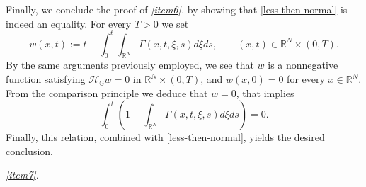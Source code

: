 \documentclass[11pt,a4paper]{article}
\numberwithin{equation}{section}
\def \rn {{\mathbb {R}}^{N}}
\def \GG {{\mathbb{G}}}
\def \H {\mathscr{H}_\GG}
\def \G {{\Gamma}}
\def \x {{\xi}}
\begin{document}
\begin{pf-fundamental}
	
	Finally, we conclude the proof of \emph{\ref{item6}.} by showing that \eqref{less-then-normal} is indeed an equality. For every $T>0$ we set
	\begin{equation}
		w(x,t):=t-\int_0^{t}\int_{\rn}\G(x,t,\x,s)d\x ds,\qquad (x,t)\in \rn\times(0,T).
	\end{equation}
	By the same arguments previously employed, we see that $w$ is a nonnegative function satisfying $\H w=0$ in $ \rn\times(0,T)$, and $w(x,0)=0$ for every $x\in\rn$. From the comparison principle we deduce that $w=0$, that implies
	\begin{equation}
		\int_0^t \left(1-\int_{\rn}\G(x,t,\x,s)d\x ds\right)=0.
	\end{equation} 
	Finally, this relation, combined with \eqref{less-then-normal}, yields the desired conclusion.
	
	
	\medskip\emph{\ref{item7}.} 
	

\end{pf-fundamental}
\end{document}
